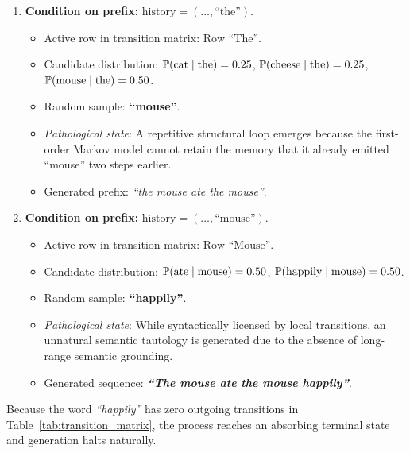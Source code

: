\documentclass[../../main.tex]{subfiles}
\begin{document}
\begin{enumerate}[label=\textbf{Step \arabic*:}, leftmargin=2.0cm]
    \item \textbf{Condition on prefix:} $\text{history} = (\dots, \text{``the''})$.
    \begin{itemize}
        \item Active row in transition matrix: $\text{Row ``The''}$.
        \item Candidate distribution: $\mathbb{P}(\text{cat}\mid\text{the}) = 0.25$, $\mathbb{P}(\text{cheese}\mid\text{the}) = 0.25$, $\mathbb{P}(\text{mouse}\mid\text{the}) = 0.50$.
        \item Random sample: \textbf{``mouse''}.
        \item \textit{Pathological state}: A repetitive structural loop emerges because the first-order Markov model cannot retain the memory that it already emitted ``mouse'' two steps earlier.
        \item Generated prefix: \textit{``the mouse ate the mouse''}.
    \end{itemize}

    \item \textbf{Condition on prefix:} $\text{history} = (\dots, \text{``mouse''})$.
    \begin{itemize}
        \item Active row in transition matrix: $\text{Row ``Mouse''}$.
        \item Candidate distribution: $\mathbb{P}(\text{ate}\mid\text{mouse}) = 0.50$, $\mathbb{P}(\text{happily}\mid\text{mouse}) = 0.50$.
        \item Random sample: \textbf{``happily''}.
        \item \textit{Pathological state}: While syntactically licensed by local transitions, an unnatural semantic tautology is generated due to the absence of long-range semantic grounding.
        \item Generated sequence: \textbf{\textit{``The mouse ate the mouse happily''}}.
    \end{itemize}
\end{enumerate}

Because the word \textit{``happily''} has zero outgoing transitions in Table~\ref{tab:transition_matrix}, the process reaches an absorbing terminal state and generation halts naturally.
\end{document}
